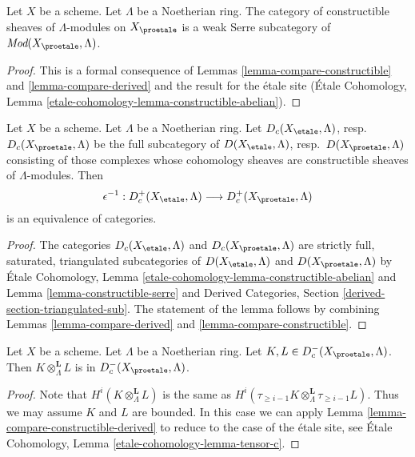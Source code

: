 \begin{lemma}
\label{lemma-constructible-serre}
Let $X$ be a scheme. Let $\Lambda$ be a Noetherian ring.
The category of constructible sheaves of $\Lambda$-modules on $X_\proetale$
is a weak Serre subcategory of $\textit{Mod}(X_\proetale, \Lambda)$.
\end{lemma}

\begin{proof}
This is a formal consequence of
Lemmas \ref{lemma-compare-constructible} and \ref{lemma-compare-derived}
and the result for the \'etale site
(\'Etale Cohomology, Lemma \ref{etale-cohomology-lemma-constructible-abelian}).
\end{proof}

\begin{lemma}
\label{lemma-compare-constructible-derived}
Let $X$ be a scheme. Let $\Lambda$ be a Noetherian ring.
Let $D_c(X_\etale, \Lambda)$, resp.\ $D_c(X_\proetale, \Lambda)$
be the full subcategory of
$D(X_\etale, \Lambda)$, resp.\ $D(X_\proetale, \Lambda)$
consisting of those complexes whose cohomology sheaves are
constructible sheaves of $\Lambda$-modules. Then
$$
\epsilon^{-1} :
D_c^+(X_\etale, \Lambda)
\longrightarrow
D_c^+(X_\proetale, \Lambda)
$$
is an equivalence of categories.
\end{lemma}

\begin{proof}
The categories $D_c(X_\etale, \Lambda)$ and $D_c(X_\proetale, \Lambda)$
are strictly full, saturated, triangulated subcategories of
$D(X_\etale, \Lambda)$ and $D(X_\proetale, \Lambda)$ by
\'Etale Cohomology, Lemma \ref{etale-cohomology-lemma-constructible-abelian}
and
Lemma \ref{lemma-constructible-serre}
and
Derived Categories, Section \ref{derived-section-triangulated-sub}.
The statement of the lemma follows by combining
Lemmas \ref{lemma-compare-derived} and
\ref{lemma-compare-constructible}.
\end{proof}

\begin{lemma}
\label{lemma-tensor-c}
Let $X$ be a scheme. Let $\Lambda$ be a Noetherian ring.
Let $K, L \in D_c^-(X_\proetale, \Lambda)$. Then
$K \otimes_\Lambda^\mathbf{L} L$ is in $D_c^-(X_\proetale, \Lambda)$.
\end{lemma}

\begin{proof}
Note that $H^i(K \otimes_\Lambda^\mathbf{L} L)$ is the same as
$H^i(\tau_{\geq i - 1}K \otimes_\Lambda^\mathbf{L} \tau_{\geq i - 1}L)$.
Thus we may assume $K$ and $L$ are bounded.
In this case we can apply Lemma \ref{lemma-compare-constructible-derived} to
reduce to the case of the \'etale site, see
\'Etale Cohomology, Lemma \ref{etale-cohomology-lemma-tensor-c}.
\end{proof}

